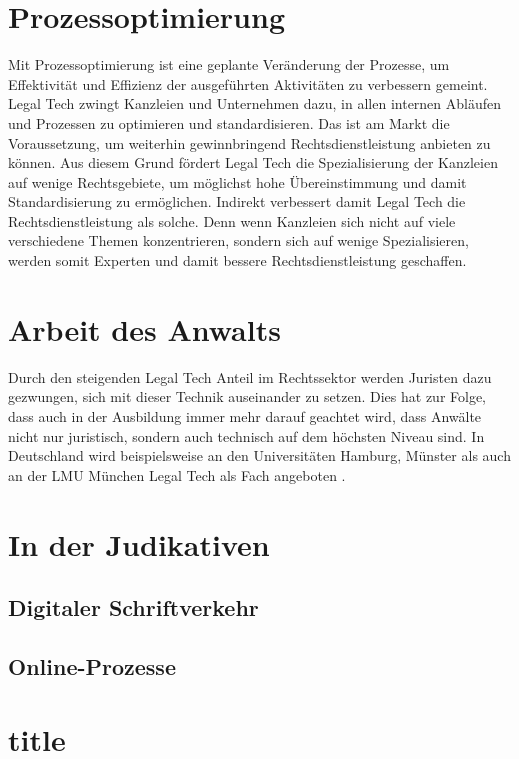 \section{Prozessoptimierung}
Mit Prozessoptimierung ist eine geplante Veränderung der Prozesse, um Effektivität und Effizienz der ausgeführten Aktivitäten zu verbessern gemeint. Legal Tech zwingt Kanzleien und Unternehmen dazu, in allen internen Abläufen und Prozessen zu optimieren und standardisieren. Das ist am Markt die Voraussetzung, um weiterhin gewinnbringend Rechtsdienstleistung anbieten zu können. Aus diesem Grund fördert Legal Tech die Spezialisierung der Kanzleien auf wenige Rechtsgebiete, um möglichst hohe Übereinstimmung und damit Standardisierung zu ermöglichen. Indirekt verbessert damit Legal Tech die Rechtsdienstleistung als solche. Denn wenn Kanzleien sich nicht auf viele verschiedene Themen konzentrieren, sondern sich auf wenige Spezialisieren, werden somit Experten und damit bessere Rechtsdienstleistung geschaffen.
\section{Arbeit des Anwalts}
Durch den steigenden Legal Tech Anteil im Rechtssektor werden Juristen dazu gezwungen, sich mit dieser Technik auseinander zu setzen. Dies hat zur Folge, dass auch in der Ausbildung immer mehr darauf geachtet wird, dass Anwälte nicht nur juristisch, sondern auch technisch auf dem höchsten Niveau sind. In Deutschland wird beispielsweise an den Universitäten Hamburg, Münster als auch an der LMU München Legal Tech als Fach angeboten \cite{Engelhardt}. 
\section{In der Judikativen}
\subsection{Digitaler Schriftverkehr}
\subsection{Online-Prozesse}


\section{title}